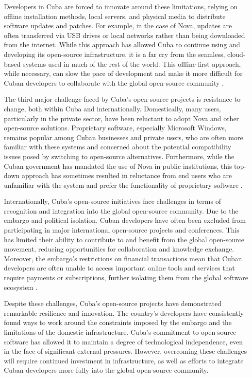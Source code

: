 \begin{refsection}
Developers in Cuba are forced to innovate around these limitations, relying on offline installation methods, local servers, and physical media to distribute software updates and patches. For example, in the case of Nova, updates are often transferred via USB drives or local networks rather than being downloaded from the internet. While this approach has allowed Cuba to continue using and developing its open-source infrastructure, it is a far cry from the seamless, cloud-based systems used in much of the rest of the world. This offline-first approach, while necessary, can slow the pace of development and make it more difficult for Cuban developers to collaborate with the global open-source community \cite[pp.~112-134]{kapcia}.

The third major challenge faced by Cuba’s open-source projects is resistance to change, both within Cuba and internationally. Domestically, many users, particularly in the private sector, have been reluctant to adopt Nova and other open-source solutions. Proprietary software, especially Microsoft Windows, remains popular among Cuban businesses and private users, who are often more familiar with these systems and concerned about the potential compatibility issues posed by switching to open-source alternatives. Furthermore, while the Cuban government has mandated the use of Nova in public institutions, this top-down approach has sometimes resulted in reluctance from end users who are unfamiliar with the system and prefer the functionality of proprietary software \cite[pp.~89-102]{feinberg}.

Internationally, Cuba’s open-source initiatives face challenges in terms of recognition and integration into the global open-source community. Due to the embargo and political isolation, Cuban developers have often been excluded from participating in major international open-source projects and conferences. This has limited their ability to contribute to and benefit from the global open-source movement, reducing opportunities for collaboration and knowledge exchange. Moreover, the embargo’s restrictions on financial transactions mean that Cuban developers are often unable to access important online tools and services that require payments or subscriptions, further isolating them from the global software ecosystem \cite[pp.~67-89]{perez}.

Despite these challenges, Cuba’s open-source projects have demonstrated remarkable resilience and innovation. The country’s developers have consistently found ways to work around the constraints imposed by the embargo and the limitations of the domestic infrastructure. Cuba’s commitment to open-source software has allowed it to maintain a degree of technological independence, even in the face of significant external pressures. However, overcoming these challenges will require continued investment in infrastructure, as well as efforts to integrate Cuban developers more fully into the global open-source community.


\end{refsection}
